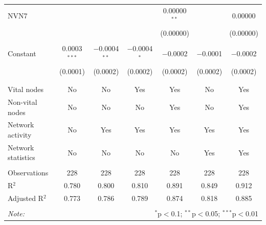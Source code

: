 \begin{table}[!htbp]
\begin{tabular}{@{\extracolsep{5pt}}lcccccc}
 NVN7 &  &  &  & 0.00000$^{**}$ &  & 0.00000 \\ 
  &  &  &  & (0.00000) &  & (0.00000) \\ 
  & & & & & & \\ 
 Constant & 0.0003$^{***}$ & $-$0.0004$^{**}$ & $-$0.0004$^{*}$ & $-$0.0002 & $-$0.0001 & $-$0.0002 \\ 
  & (0.0001) & (0.0002) & (0.0002) & (0.0002) & (0.0002) & (0.0002) \\ 
  & & & & & & \\ 
\hline \\[-1.8ex] 
Vital nodes & No & No & Yes & Yes & No & Yes \\ 
Non-vital nodes & No & No & No & Yes & No & Yes \\ 
Network activity & No & Yes & Yes & Yes & Yes & Yes \\ 
Network statistics & No & No & No & No & Yes & Yes \\ 
\hline &  &  &  &  &  &  \\ 
Observations & 228 & 228 & 228 & 228 & 228 & 228 \\ 
R$^{2}$ & 0.780 & 0.800 & 0.810 & 0.891 & 0.849 & 0.912 \\ 
Adjusted R$^{2}$ & 0.773 & 0.786 & 0.789 & 0.874 & 0.818 & 0.885 \\ 
\hline 
\hline \\[-1.8ex] 
\textit{Note:}  & \multicolumn{6}{r}{$^{*}$p$<$0.1; $^{**}$p$<$0.05; $^{***}$p$<$0.01} \\ 
\end{tabular} 
\end{table} 
